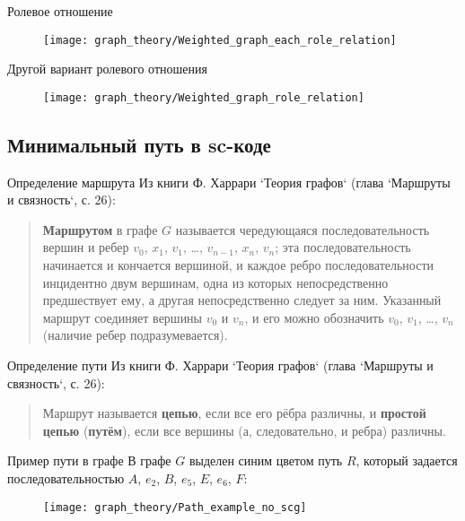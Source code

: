 \begin{frame}{Ролевое отношение }
  \begin{figure}
    \centering
    \texttt{[image: graph\_theory/Weighted\_graph\_each\_role\_relation]}
  \end{figure}
\end{frame}

\begin{frame}{Другой вариант ролевого отношения }
  \begin{figure}
    \centering
    \texttt{[image: graph\_theory/Weighted\_graph\_role\_relation]}
  \end{figure}
\end{frame}

\subsection{Минимальный путь в sc-коде}

\begin{frame}{Определение маршрута}
  Из книги Ф. Харрари `Теория графов` (глава `Маршруты и связность`, с. 26):
  \begin{quote}
    \textbf{Маршрутом} в графе $G$ называется чередующаяся последовательность
    вершин и ребер $v_0$, $x_1$, $v_1$, …, $v_{n-1}$, $x_n$, $v_n$; эта последовательность
    начинается и кончается вершиной, и каждое ребро последовательности
    инцидентно двум вершинам, одна из которых непосредственно
    предшествует ему, а другая непосредственно следует за
    ним. Указанный маршрут соединяет вершины $v_0$ и $v_n$, и его можно
    обозначить $v_0$, $v_1$, …, $v_n$ (наличие ребер подразумевается).
  \end{quote}
\end{frame}

\begin{frame}{Определение пути}
  Из книги Ф. Харрари `Теория графов` (глава `Маршруты и связность`, с. 26):
  \begin{quote}
    Маршрут называется \textbf{цепью}, если все его рёбра различны, и
    \textbf{простой цепью} (\textbf{путём}), если все вершины (а,
    следовательно, и ребра) различны.
  \end{quote}
\end{frame}

\begin{frame}{Пример пути в графе}
  В графе $G$ выделен синим цветом путь $R$, который задается
  последовательностью $A$, $e_2$, $B$, $e_5$, $E$, $e_6$, $F$:
  \begin{figure}
    \centering
    \texttt{[image: graph\_theory/Path\_example\_no\_scg]}
  \end{figure}
\end{frame}

